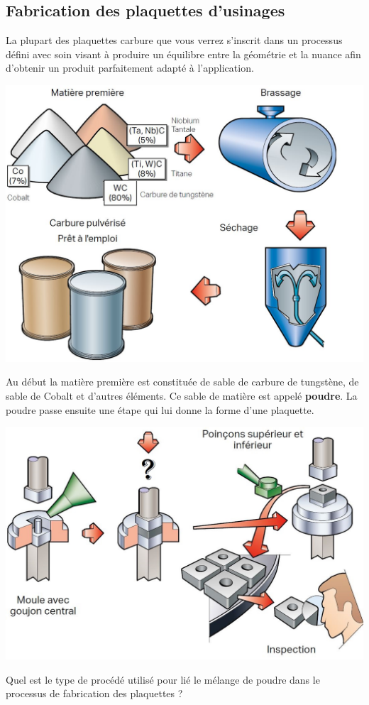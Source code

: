 \documentclass[12pt]{article}
\newcounter{exo}
\newenvironment{exo}{\stepcounter{exo}\vspace{0.5cm}{\bfseries Question \theexo\ :}}{\par\vspace{0.5cm}}
\begin{document}
\subsection{Fabrication des plaquettes d'usinages}
La plupart des plaquettes carbure que vous verrez s'inscrit dans un processus défini avec soin visant à produire un équilibre entre la géométrie et la nuance afin d'obtenir un produit parfaitement adapté à l'application.

\begin{center}
\includegraphics[width=0.6\linewidth]{Images/PLA11.JPG}
\end{center}

Au début la matière première est constituée de sable de carbure de tungstène, de sable de Cobalt et d'autres éléments. Ce sable de matière est appelé \textbf{poudre}. La poudre passe ensuite une étape qui lui donne la forme d'une plaquette.



\begin{center}
\includegraphics[width=0.7\linewidth]{Images/PLA12.JPG}
\end{center}

\begin{exo} Quel est le type de procédé utilisé pour lié le mélange de poudre dans le processus de fabrication des plaquettes ?\end{exo}
\end{document}
